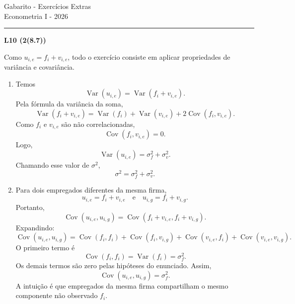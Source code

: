 \documentclass[12pt,letterpaper,onecolumn]{exam}
\begin{document}
\begingroup
    \centering
    \LARGE Gabarito - Exercícios Extras\\[0.5em]
    \large Econometria I - 2026 \par
\endgroup
\rule{\textwidth}{0.4pt}

\begin{questions}

\question \textbf{L10 (2(8.7))}

Como \(u_{i,e}=f_i+v_{i,e}\), todo o exercício consiste em aplicar propriedades de variância e covariância.

\begin{enumerate}[label=(\roman*)]
    \item Temos
    \[
    \operatorname{Var}(u_{i,e})
    =
    \operatorname{Var}(f_i+v_{i,e}).
    \]
    Pela fórmula da variância da soma,
    \[
    \operatorname{Var}(f_i+v_{i,e})
    =
    \operatorname{Var}(f_i)+\operatorname{Var}(v_{i,e})
    +2\operatorname{Cov}(f_i,v_{i,e}).
    \]
    Como \(f_i\) e \(v_{i,e}\) são não correlacionadas,
    \[
    \operatorname{Cov}(f_i,v_{i,e})=0.
    \]
    Logo,
    \[
    \operatorname{Var}(u_{i,e})
    =
    \sigma_f^2+\sigma_v^2.
    \]
    Chamando esse valor de \(\sigma^2\),
    \[
    \sigma^2=\sigma_f^2+\sigma_v^2.
    \]

    \item Para dois empregados diferentes da mesma firma,
    \[
    u_{i,e}=f_i+v_{i,e}
    \quad\text{e}\quad
    u_{i,g}=f_i+v_{i,g}.
    \]
    Portanto,
    \[
    \operatorname{Cov}(u_{i,e},u_{i,g})
    =
    \operatorname{Cov}(f_i+v_{i,e},f_i+v_{i,g}).
    \]
    Expandindo:
    \[
    \operatorname{Cov}(u_{i,e},u_{i,g})
    =
    \operatorname{Cov}(f_i,f_i)
    +
    \operatorname{Cov}(f_i,v_{i,g})
    +
    \operatorname{Cov}(v_{i,e},f_i)
    +
    \operatorname{Cov}(v_{i,e},v_{i,g}).
    \]
    O primeiro termo é
    \[
    \operatorname{Cov}(f_i,f_i)=\operatorname{Var}(f_i)=\sigma_f^2.
    \]
    Os demais termos são zero pelas hipóteses do enunciado. Assim,
    \[
    \operatorname{Cov}(u_{i,e},u_{i,g})=\sigma_f^2.
    \]
    A intuição é que empregados da mesma firma compartilham o mesmo componente não observado \(f_i\).


\end{enumerate}
\end{questions}
\end{document}
